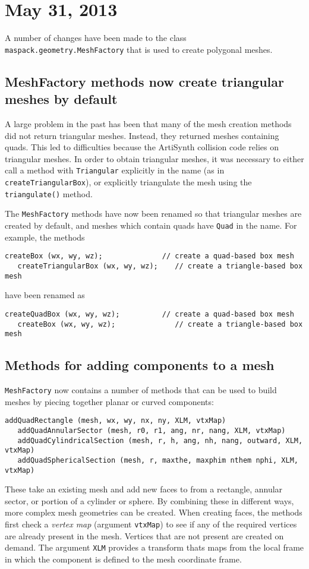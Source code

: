 \documentclass{article}
\begin{document}
\section*{May 31, 2013}

A number of changes have been made to the class {\tt
maspack.geometry.MeshFactory} that is used to create polygonal meshes.

\subsection*{MeshFactory methods now create triangular meshes by
default}

A large problem in the past has been that many of the mesh creation
methods did not return triangular meshes. Instead, they returned
meshes containing quads. This led to difficulties because the
ArtiSynth collision code relies on triangular meshes. In order to
obtain triangular meshes, it was necessary to either call a method
with {\tt Triangular} explicitly in the name (as in {\tt
createTriangularBox}), or explicitly triangulate the mesh using the
{\tt triangulate()} method.

The {\tt MeshFactory} methods have now been renamed so that triangular
meshes are created by default, and meshes which contain quads have
{\tt Quad} in the name. For example, the methods
\begin{lstlisting}[]
   createBox (wx, wy, wz);              // create a quad-based box mesh
   createTriangularBox (wx, wy, wz);    // create a triangle-based box mesh
\end{lstlisting}
have been renamed as
\begin{lstlisting}[]
   createQuadBox (wx, wy, wz);          // create a quad-based box mesh
   createBox (wx, wy, wz);              // create a triangle-based box mesh
\end{lstlisting}

\subsection*{Methods for adding components to a mesh}

{\tt MeshFactory} now contains a number of methods that can be used to
build meshes by piecing together planar or curved components:
\begin{lstlisting}[]
   addQuadRectangle (mesh, wx, wy, nx, ny, XLM, vtxMap)
   addQuadAnnularSector (mesh, r0, r1, ang, nr, nang, XLM, vtxMap)
   addQuadCylindricalSection (mesh, r, h, ang, nh, nang, outward, XLM, vtxMap)
   addQuadSphericalSection (mesh, r, maxthe, maxphim nthem nphi, XLM, vtxMap)
\end{lstlisting}
These take an existing mesh and add new faces to from a rectangle,
annular sector, or portion of a cylinder or sphere. By combining these
in different ways, more complex mesh geometries can be created. When
creating faces, the methods first check a {\it vertex map} (argument
{\tt vtxMap}) to see if any of the required vertices are already
present in the mesh. Vertices that are not present are created on
demand.  The argument {\tt XLM} provides a transform thats maps from
the local frame in which the component is defined to the mesh
coordinate frame.
\end{document}
